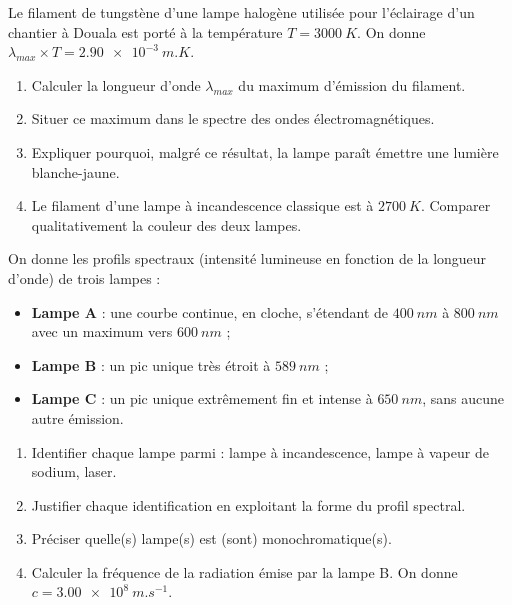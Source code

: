 \documentclass[11pt]{article}
\begin{document}
\begin{exercice}
Le filament de tungstène d'une lampe halogène utilisée pour l'éclairage d'un chantier à Douala est porté à la température $T = \SI{3000}{K}$. On donne $\lambda_{max} \times T = \SI{2,90e-3}{m.K}$.
\begin{enumerate}
\item Calculer la longueur d'onde $\lambda_{max}$ du maximum d'émission du filament.
\item Situer ce maximum dans le spectre des ondes électromagnétiques.
\item Expliquer pourquoi, malgré ce résultat, la lampe paraît émettre une lumière blanche-jaune.
\item Le filament d'une lampe à incandescence classique est à $\SI{2700}{K}$. Comparer qualitativement la couleur des deux lampes.
\end{enumerate}
\end{exercice}

\begin{exercice}
On donne les profils spectraux (intensité lumineuse en fonction de la longueur d'onde) de trois lampes :
\begin{itemize}
\item \textbf{Lampe A} : une courbe continue, en cloche, s'étendant de $\SI{400}{nm}$ à $\SI{800}{nm}$ avec un maximum vers $\SI{600}{nm}$ ;
\item \textbf{Lampe B} : un pic unique très étroit à $\SI{589}{nm}$ ;
\item \textbf{Lampe C} : un pic unique extrêmement fin et intense à $\SI{650}{nm}$, sans aucune autre émission.
\end{itemize}
\begin{enumerate}
\item Identifier chaque lampe parmi : lampe à incandescence, lampe à vapeur de sodium, laser.
\item Justifier chaque identification en exploitant la forme du profil spectral.
\item Préciser quelle(s) lampe(s) est (sont) monochromatique(s).
\item Calculer la fréquence de la radiation émise par la lampe B. On donne $c = \SI{3,00e8}{m.s^{-1}}$.
\end{enumerate}
\end{exercice}
\end{document}
